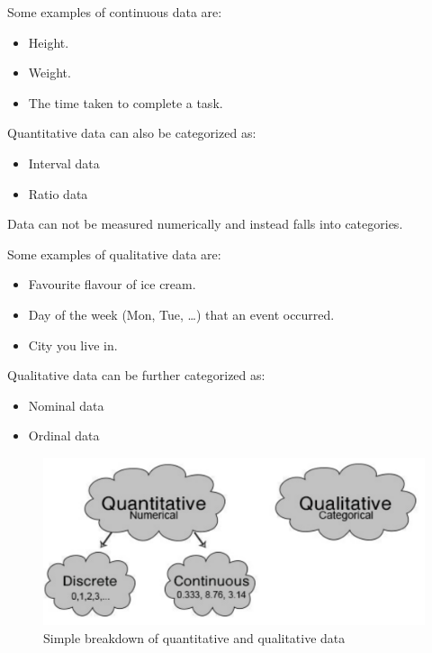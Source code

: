 \noindent
Some examples of continuous data are:
\begin{itemize}
	\item Height.
	\item Weight.
	\item The time taken to complete a task.
\end{itemize}

\begin{nt}
Quantitative data can also be categorized as:
\begin{itemize}
\item	Interval data
\item	Ratio data
\end{itemize}
\end{nt}


\begin{definition}	
Data can not be measured numerically and instead falls into categories.
\end{definition}

\noindent
Some examples of qualitative data are:
\begin{itemize}
	\item	Favourite flavour of ice cream.
	\item	Day of the week (Mon, Tue, \ldots) that an event occurred.
	\item	City you live in.
\end{itemize}

\begin{nt}
Qualitative data can be further categorized as:
\begin{itemize}
\item	Nominal data
\item	Ordinal data
\end{itemize}
\end{nt}

\begin{figure}[H]
\centering
	\includegraphics[scale=0.75]{Section1/quantqual.pdf}
		\caption{Simple breakdown of quantitative and qualitative data}
\end{figure}



